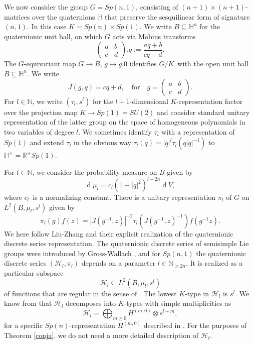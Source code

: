 \documentclass[a4paper,reqno]{amsart}
\numberwithin{equation}{section}
\def\rd{\operatorname{d}\!}
\def\R{\mathbb{R}}
\def\N{\mathbb{N}}
\theoremstyle{definition}
\theoremstyle{remark}
\begin{document}
We now consider the group $G=Sp(n,1)$, consisting of $(n+1)\times (n+1)$-matrices over the quaternions $\mathbb{H}$ that preserve the sesquilinear form of signature $(n,1)$. In this case $K=Sp(n)\times Sp(1)$. We write $B\subseteq \mathbb{H}^n$ for the quaternionic unit ball, on which $G$ acts via Möbius transforms 
$$\begin{pmatrix} a& b\\c&d\end{pmatrix}.q:=\frac{aq+b}{cq+d}.$$
The $G$-equivariant map $G\to B$, $g\mapsto g.0$ identifies $G/K$ with the open unit ball $B\subseteq \mathbb{H}^n$. We write 
$$J(g,q)=cq+d, \quad\mbox{for}\quad g=\begin{pmatrix} a& b\\c&d\end{pmatrix}.$$ 
For $l\in \N$, we write $(\tau_l,s^l)$ for the $l+1$-dimensional $K$-representation factor over the projection map $K\to Sp(1)=SU(2)$ and consider standard unitary representation of the latter group on the space of homogeneous polynomials in two variables of degree $l$. We sometimes identify $\tau_l$ with a representation of $Sp(1)$ and extend $\tau_l$ in the obvious way $\tau_l(q)=|q|^l\tau_l(q|q|^{-1})$ to $\mathbb{H}^\times =\R^+ Sp(1)$. 

For $l\in \N$, we consider the probability measure on $B$ given by 
$$\rd\mu_l=c_l(1-|q|^2)^{l-2n} \rd V,$$
where $c_l$ is a normalizing constant. There is a unitary representation $\pi_l$ of $G$ on $L^2(B,\mu_l,s^l)$ given by  
$$\pi_l(g)f(z)=|J(g^{-1},z)|^{-2}\tau_l(J(g^{-1},z)^{-1})f(g^{-1}z).$$
We here follow Liu-Zhang \cite{liuzhang} and their explicit realization of the quaternionic discrete series representation. The quaternionic discrete series of semisimple Lie groups were introduced by Gross-Wallach \cite{grosswallach}, and  for $Sp(n,1)$ the quaternionic discrete series $(\mathcal{H}_l,\pi_l)$  depends on a parameter $l\in \N_{\geq 2n}$. It is realized as a particular subspace
$$\mathcal{H}_l\subseteq L^2(B,\mu_l,s^l)$$
of functions that are regular in the sense of \cite[Section 2.3]{liuzhang}. The lowest $K$-type in $\mathcal{H}_l$ is $s^l$. We know from \cite{grosswallach,liuzhang} that $\mathcal{H}_l$ decomposes into $K$-types with simple multiplicities as 
$$\mathcal{H}_l=\bigoplus_{m\geq 0} H^{(m,0)}\otimes s^{l+m},$$
for a specific $Sp(n)$-representation $H^{(m,0)}$ described in \cite[Proposition 4.3]{liuzhang}. For the purposes of Theorem \ref{conja}, we do not need a more detailed description of $\mathcal{H}_l$. 
\end{document}
